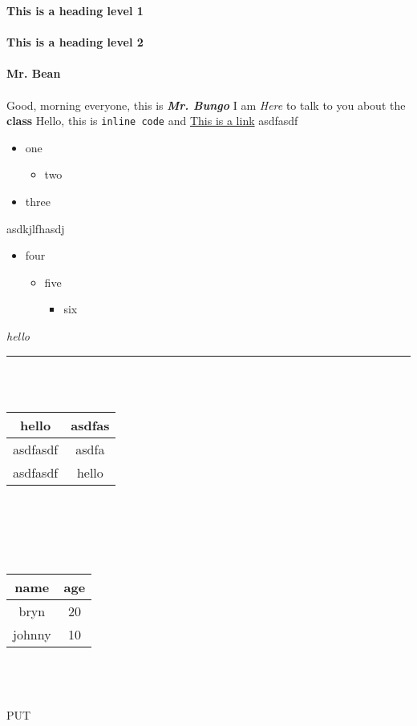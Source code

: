\documentclass{article}
\begin{document}
{\noindent \Huge \textbf{This is a heading level 1}}\\\\
{\noindent \LARGE \textbf{This is a heading level 2}}\\\\
{\noindent \Large \textbf{Mr. Bean}}\\\\
Good, morning everyone, this is \textbf{\textit{Mr. Bungo}} I am \textit{Here} to talk to you about the \textbf{class}
Hello, this is \verb|inline code| and \href{http://www.example.com}{This is a link}
asdfasdf
\begin{itemize}
	\item one
	\begin{itemize}
		\item two
	\end{itemize}
	\item three
\end{itemize}
asdkjlfhasdj
\begin{itemize}
	\item four
	\begin{itemize}
		\item five
		\begin{itemize}
			\item six
		\end{itemize}
	\end{itemize}
\end{itemize}
    \textit{hello}
\\
\rule{170mm}{1pt}\\\\
\begin{tabular}{|c|c|}
	\hline
	hello & asdfas \\
	\hline
	asdfasdf & asdfa \\
	\hline
	asdfasdf & hello \\
	\hline
\end{tabular}\\\\\\
\\
\begin{tabular}{|c|c|}
	\hline
	name & age \\
	\hline
	bryn & 20 \\
	\hline
	johnny & 10 \\
	\hline
\end{tabular}\\\\\\
PUT
\end{document}
